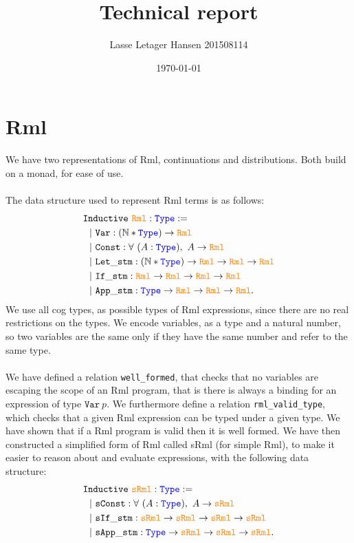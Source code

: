 \documentclass[11pt, leqno]{article}
\author{Lasse Letager Hansen 201508114}
\date{\today}
\title{Technical report}
\newcommand{\Rml}{\textcolor{orange}{\mathtt{Rml}}}
\newcommand{\sRml}{\textcolor{orange}{\mathtt{sRml}}}
\newcommand{\Type}{\textcolor{blue}{\mathtt{Type}}}
\newcommand{\wellformed}{\texttt{well\_formed}}
\newcommand{\valid}{\texttt{rml\_valid\_type}}
\begin{document}
\maketitle

\section{Rml}
We have two representations of Rml, continuations and distributions. Both build on a monad, for ease of use.
\\ \\
The data structure used to represent Rml terms is as follows:
\begin{align*}
  &\mathtt{Inductive}~\Rml : \Type := \\
  &~~|~ \mathtt{Var} : (\mathbb{N} * \Type) \rightarrow \Rml \\
  &~~|~ \mathtt{Const} : \forall~(A : \Type),~A \rightarrow \Rml \\
  &~~|~ \mathtt{Let\_stm} : (\mathbb{N} * \Type) \rightarrow \Rml \rightarrow \Rml \rightarrow \Rml \\
  &~~|~ \mathtt{If\_stm} : \Rml \rightarrow \Rml \rightarrow \Rml \rightarrow \Rml \\
  &~~|~ \mathtt{App\_stm} : \Type \rightarrow \Rml \rightarrow \Rml \rightarrow \Rml.
\end{align*}
We use all cog types, as possible types of Rml expressions, since there are no real restrictions on the types. We encode variables, as a type and a natural number, so two variables are the same only if they have the same number and refer to the same type.
\\ \\
We have defined a relation \wellformed, that checks that no variables are escaping the scope of an Rml program, that is there is always a binding for an expression of type \(\mathtt{Var}~p\). We furthermore define a relation \valid, which checks that a given Rml expression can be typed under a given type. We have shown that if a Rml program is valid then it is well formed. We have then constructed a simplified form of Rml called sRml (for simple Rml), to make it easier to reason about and evaluate expressions, with the following data structure:
\begin{align*}
  &\mathtt{Inductive}~\sRml : \Type := \\
  &~~|~ \mathtt{sConst} : \forall~(A : \Type),~A \rightarrow \sRml \\
  &~~|~ \mathtt{sIf\_stm} : \sRml \rightarrow \sRml \rightarrow \sRml \rightarrow \sRml \\
  &~~|~ \mathtt{sApp\_stm} : \Type \rightarrow \sRml \rightarrow \sRml \rightarrow \sRml.
\end{align*}
\end{document}

